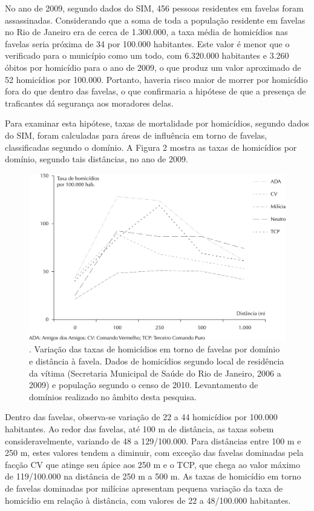 \documentclass{article}
\begin{document}
No ano de 2009, segundo dados do SIM, 456 pessoas residentes em favelas foram
assassinadas. Considerando que a soma de toda a população residente em favelas
no Rio de Janeiro era de cerca de 1.300.000, a taxa média de homicídios nas
favelas seria próxima de 34 por 100.000 habitantes. Este valor é menor que o
verificado para o município como um todo, com 6.320.000 habitantes e 3.260
óbitos por homicídio para o ano de 2009, o que produz um valor aproximado de 52
homicídios por 100.000. Portanto, haveria risco maior de morrer por homicídio
fora do que dentro das favelas, o que confirmaria a hipótese de que a presença
de traficantes dá segurança aos moradores delas.

Para examinar esta hipótese, taxas de mortalidade por homicídios, segundo dados
do SIM, foram calculadas para áreas de influência em torno de favelas,
classificadas segundo o domínio. A Figura 2 mostra as taxas de homicídios por
domínio, segundo tais distâncias, no ano de 2009.

\begin{figure}
\includegraphics[width=\textwidth]{0034-8910-rsp-48-01-0094-gf02}
\caption{. Variação das taxas de homicídios em torno de favelas por domínio e
distância à favela. Dados de homicídios segundo local de residência da vítima
(Secretaria Municipal de Saúde do Rio de Janeiro, 2006 a 2009) e população
segundo o censo de 2010. Levantamento de domínios realizado no âmbito desta
pesquisa.}
\end{figure}

Dentro das favelas, observa-se variação de 22 a 44 homicídios por 100.000
habitantes. Ao redor das favelas, até 100 m de distância, as taxas sobem
consideravelmente, variando de 48 a 129/100.000. Para distâncias entre 100 m e
250 m, estes valores tendem a diminuir, com exceção das favelas dominadas pela
facção CV que atinge seu ápice aos 250 m e o TCP, que chega ao valor máximo de
119/100.000 na distância de 250 m a 500 m. As taxas de homicídio em torno de
favelas dominadas por milícias apresentam pequena variação da taxa de homicídio
em relação à distância, com valores de 22 a 48/100.000 habitantes.
\end{document}
